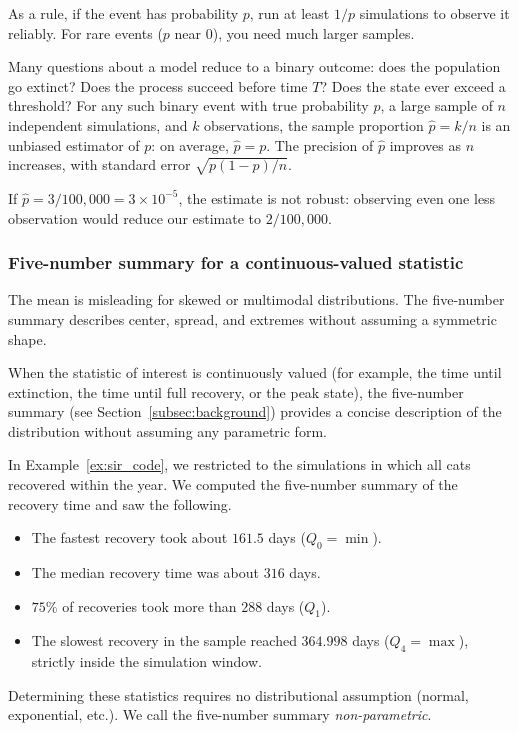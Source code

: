 As a rule, if the event has probability $p$, run at least $1/p$ simulations to observe it reliably. For rare events ($p$ near $0$), you need much larger samples.

Many questions about a model reduce to a binary outcome: does the population go extinct? Does the process succeed before time $T$? Does the state ever exceed a threshold? For any such binary event with true probability $p$, a large sample of $n$ independent simulations, and $k$ observations, the sample proportion $\hat{p} = k/n$ is an unbiased estimator of $p$: on average, $\hat{p} = p$. The precision of $\hat{p}$ improves as $n$ increases, with standard error $\sqrt{p(1-p)/n}$.

If $\hat{p} = 3/100{,}000 = 3\times 10^{-5}$, the estimate is not robust: observing even one less observation would reduce our estimate to $2/100{,}000$.

\subsubsection{Five-number summary for a continuous-valued statistic}\label{subsubsec:five_number}

The mean is misleading for skewed or multimodal distributions. The five-number summary describes center, spread, and extremes without assuming a symmetric shape.

When the statistic of interest is continuously valued (for example, the time until extinction, the time until full recovery, or the peak state), the five-number summary (see Section~\ref{subsec:background}) provides a concise description of the distribution without assuming any parametric form.

In Example~\ref{ex:sir_code}, we restricted to the simulations in which all cats recovered within the year.
We computed the five-number summary of the recovery time and saw the following.
\begin{itemize}
\item The fastest recovery took about $161.5$ days ($Q_0 = \min$).
\item The median recovery time was about $316$ days.
\item $75\%$ of recoveries took more than $288$ days ($Q_1$).
\item The slowest recovery in the sample reached $364.998$ days ($Q_4 = \max$), strictly inside the simulation window.
\end{itemize}
Determining these statistics requires no distributional assumption (normal, exponential, etc.). We call the five-number summary \textit{non-parametric}.

